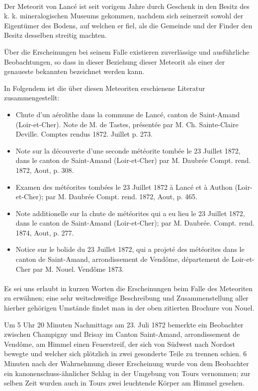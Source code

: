 \documentclass[a4paper, 11pt, oneside]{article}
\begin{document}
\paragraph{}
Der Meteorit von Lancé ist seit vorigem Jahre durch Geschenk in den Besitz des k. k. mineralogischen Museums gekommen, nachdem sich seinerzeit sowohl der Eigentümer des Bodens, auf welchen er fiel, als die Gemeinde und der Finder den Besitz desselben streitig machten.

Über die Erscheinungen bei seinem Falle existieren zuverlässige und ausführliche Beobachtungen, so dass in dieser Beziehung dieser Meteorit als einer der genaueste bekannten bezeichnet werden kann.

In Folgendem ist die über diesen Meteoriten erschienene Literatur zusammengestellt:
\begin{itemize}
    \item Chute d’un aérolithe dans la commune de Lancé, canton de Saint-Amand (Loir-et-Cher). Note de M. de Tastes, présentée par M. Ch. Sainte-Claire Deville. Comptes rendus 1872. Juillet p. 273.
    \item Note sur la découverte d’une seconde météorite tombée le 23 Juillet 1872, dans le canton de Saint-Amand (Loir-et-Cher) par M. Daubrée Compt. rend. 1872, Aout, p. 308.
    \item Examen des météorites tombées le 23 Juillet 1872 à Lancé et à Authon (Loir-et-Cher); par M. Daubrée Compt. rend. 1872, Aout, p. 465.
    \item Note additionelle sur la chute de météorites qui a eu lieu le 23 Juillet 1872, dans le canton de Saint-Amand (Loir-et-Cher); par M. Daubrée. Compt. rend. 1874, Aout, p. 277.
    \item Notice sur le bolide du 23 Juillet 1872, qui a projeté des météorites dans le canton de Saint-Amand, arrondissement de Vendôme, département de Loir-et-Cher par M. Nouel. Vendôme 1873.
\end{itemize}
\paragraph{}
Es sei uns erlaubt in kurzen Worten die Erscheinungen beim Falle des Meteoriten zu erwähnen; eine sehr weitschweifige Beschreibung und Zusammenstellung aller hierher gehörigen Umstände findet man in der oben zitierten Brochure von Nouel.

Um 5 Uhr 20 Minuten Nachmittags am 23. Juli 1872 bemerkte ein Beobachter zwischen Champigny und Brisay im Canton Saint-Amand, arrondissement de Vendôme, am Himmel einen Feuerstreif, der sich von Südwest nach Nordost bewegte und welcher sich plötzlich in zwei gesonderte Teile zu trennen schien. 6 Minuten nach der Wahrnehmung dieser Erscheinung wurde von dem Beobachter ein kanonenschuss-ähnlicher Schlag in der Umgebung von Tours vernommen; zur selben Zeit wurden auch in Tours zwei leuchtende Körper am Himmel gesehen.
\end{document}
